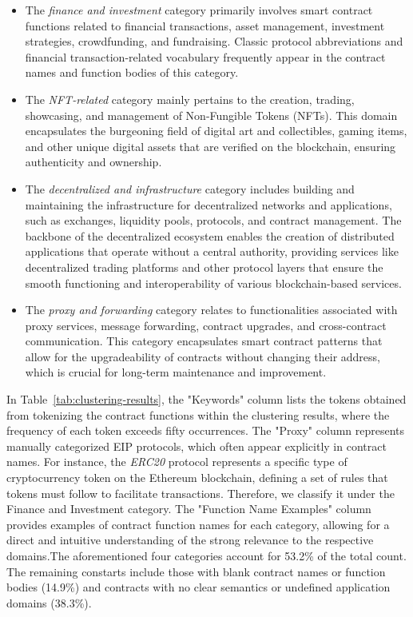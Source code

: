 \documentclass[acmsmall,screen]{acmart}
\begin{document}
	\begin{itemize}[leftmargin=0.4cm,topsep=0.1cm]
		\item The \textit{finance and investment} category primarily involves smart contract functions related to financial transactions, asset management, investment strategies, crowdfunding, and fundraising. Classic protocol abbreviations and financial transaction-related vocabulary frequently appear in the contract names and function bodies of this category.
		\item The \textit{NFT-related} category mainly pertains to the creation, trading, showcasing, and management of Non-Fungible Tokens (NFTs). This domain encapsulates the burgeoning field of digital art and collectibles, gaming items, and other unique digital assets that are verified on the blockchain, ensuring authenticity and ownership.
		\item The \textit{decentralized and infrastructure} category includes building and maintaining the infrastructure for decentralized networks and applications, such as exchanges, liquidity pools, protocols, and contract management.  The backbone of the decentralized ecosystem enables the creation of distributed applications  that operate without a central authority, providing services like decentralized trading platforms and other protocol layers that ensure the smooth functioning and interoperability of various blockchain-based services.
		\item The \textit{proxy and forwarding} category relates to functionalities associated with proxy services, message forwarding, contract upgrades, and cross-contract communication. This category encapsulates smart contract patterns that allow for the upgradeability of contracts without changing their address, which is crucial for long-term maintenance and improvement.
	\end{itemize}

	

	In Table~\ref{tab:clustering-results}, the "Keywords" column lists the tokens obtained from tokenizing the contract functions within the clustering results, where the frequency of each token exceeds fifty occurrences. The "Proxy" column represents manually categorized EIP protocols, which often appear explicitly in contract names. For instance, the \textit{ERC20} protocol represents a specific type of cryptocurrency token on the Ethereum blockchain, defining a set of rules that tokens must follow to facilitate transactions. Therefore, we classify it under the Finance and Investment category. The "Function Name Examples" column provides examples of contract function names for each category, allowing for a direct and intuitive understanding of the strong relevance to the respective domains.The aforementioned four categories account for 53.2\% of the total count. The remaining constarts include those with blank contract names or function bodies (14.9\%) and contracts with no clear semantics or undefined application domains (38.3\%).
\end{document}
